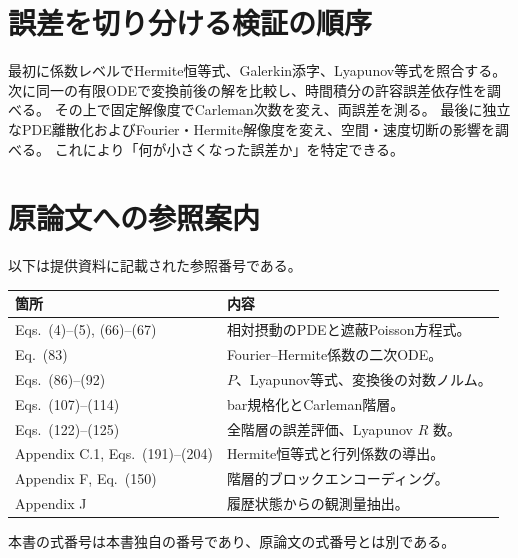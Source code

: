 \section{誤差を切り分ける検証の順序}
最初に係数レベルでHermite恒等式、Galerkin添字、Lyapunov等式を照合する。
次に同一の有限ODEで変換前後の解を比較し、時間積分の許容誤差依存性を調べる。
その上で固定解像度でCarleman次数を変え、両誤差を測る。
最後に独立なPDE離散化およびFourier・Hermite解像度を変え、空間・速度切断の影響を調べる。
これにより「何が小さくなった誤差か」を特定できる。

\section{原論文への参照案内}
以下は提供資料に記載された参照番号である。
\par\noindent
\begin{tabularx}{\textwidth}{lX}
\toprule 箇所 & 内容 \\\midrule
Eqs.~(4)--(5), (66)--(67) & 相対摂動のPDEと遮蔽Poisson方程式。\\
Eq.~(83) & Fourier--Hermite係数の二次ODE。\\
Eqs.~(86)--(92) & $P$、Lyapunov等式、変換後の対数ノルム。\\
Eqs.~(107)--(114) & bar規格化とCarleman階層。\\
Eqs.~(122)--(125) & 全階層の誤差評価、Lyapunov $R$ 数。\\
Appendix C.1, Eqs.~(191)--(204) & Hermite恒等式と行列係数の導出。\\
Appendix F, Eq.~(150) & 階層的ブロックエンコーディング。\\
Appendix J & 履歴状態からの観測量抽出。\\
\bottomrule
\end{tabularx}
本書の式番号は本書独自の番号であり、原論文の式番号とは別である。
